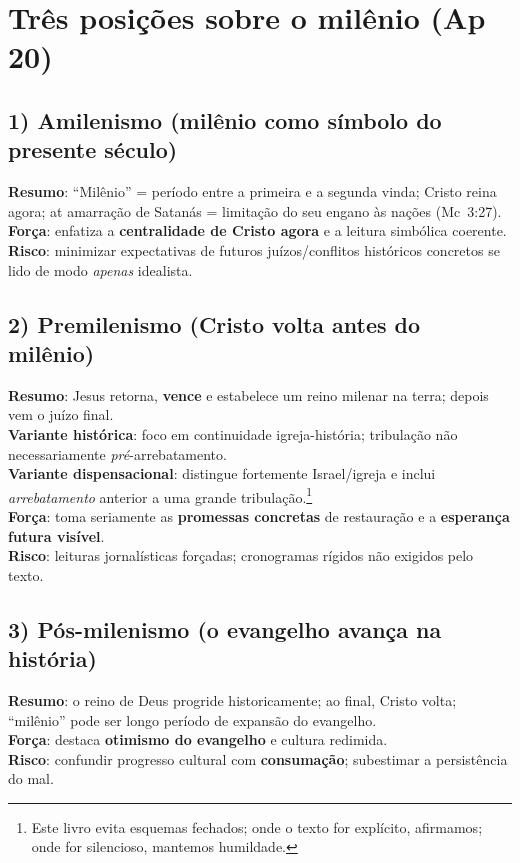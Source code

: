 \section{Três posições sobre o milênio (Ap 20)}
\subsection*{1) Amilenismo (milênio como símbolo do presente século)}
\textbf{Resumo}: ``Milênio'' = período entre a primeira e a segunda vinda; Cristo reina agora; at amarração de Satanás = limitação do seu engano às nações (Mc~3:27).\\
\textbf{Força}: enfatiza a \textbf{centralidade de Cristo agora} e a leitura simbólica coerente.\\
\textbf{Risco}: minimizar expectativas de futuros juízos/conflitos históricos concretos se lido de modo \emph{apenas} idealista.

\subsection*{2) Premilenismo (Cristo volta antes do milênio)}
\textbf{Resumo}: Jesus retorna, \textbf{vence} e estabelece um reino milenar na terra; depois vem o juízo final.\\
\textbf{Variante histórica}: foco em continuidade igreja-história; tribulação não necessariamente \emph{pré}-arrebatamento.\\
\textbf{Variante dispensacional}: distingue fortemente Israel/igreja e inclui \emph{arrebatamento} anterior a uma grande tribulação.\footnote{Este livro evita esquemas fechados; onde o texto for explícito, afirmamos; onde for silencioso, mantemos humildade.}\\
\textbf{Força}: toma seriamente as \textbf{promessas concretas} de restauração e a \textbf{esperança futura visível}.\\
\textbf{Risco}: leituras jornalísticas forçadas; cronogramas rígidos não exigidos pelo texto.

\subsection*{3) Pós-milenismo (o evangelho avança na história)}
\textbf{Resumo}: o reino de Deus progride historicamente; ao final, Cristo volta; ``milênio'' pode ser longo período de expansão do evangelho.\\
\textbf{Força}: destaca \textbf{otimismo do evangelho} e cultura redimida.\\
\textbf{Risco}: confundir progresso cultural com \textbf{consumação}; subestimar a persistência do mal.

